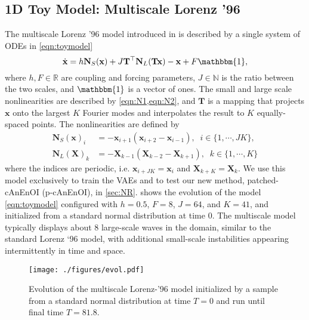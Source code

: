 \documentclass[final,3p]{elsarticle}
\theoremstyle{break}
\newcommand{\R}{\mathbb{R}}
\newcommand{\bb}[1]{\mathbf{#1}}
\begin{document}
\subsection{1D Toy Model: Multiscale Lorenz '96 }\label{methods:toymodel}
The multiscale Lorenz '96 model introduced in \cite{grooms2015framework} is described by a single system of ODEs in \cref{eqn:toymodel} 
\begin{equation}
    \dot{\bb{x}} =h\bb{N}_S(\bb{x})+J\bb{T}^{\top}\bb{N}_L(\bb{Tx})-\bb{x}+F\mathbbm{1},
    \label{eqn:toymodel}
\end{equation}
where $h,F\in\R$ are coupling and forcing parameters, $J\in\mathbb{N}$ is the ratio between the two scales, and $\mathbbm{1}$ is a vector of ones.
The small and large scale nonlinearities are described by \cref{eqn:N1,eqn:N2}, and $\bb{T}$ is a mapping that projects $\bb{x}$ onto the largest $K$ Fourier modes and interpolates the result to $K$ equally-spaced points.
The nonlinearities are defined by
\begin{align}
    \bb{N}_S(\bb{x})_i &= -\bb{x}_{i+1}(\bb{x}_{i+2}-\bb{x}_{i-1}),\;\;i\in\{1, \cdots, JK\},\label{eqn:N1}\\
    \bb{N}_L(\bb{X})_k &= -\bb{X}_{k-1}(\bb{X}_{k-2}-\bb{X}_{k+1}),\;\;k\in\{1, \cdots, K\}\label{eqn:N2}
\end{align}
where the indices are periodic, i.e. $\bb{x}_{i+JK}=\bb{x}_i$ and $\bb{X}_{k+K}=\bb{X}_k$.
We use this model exclusively to train the VAEs and to test our new method, patched-cAnEnOI (p-cAnEnOI), in \cref{sec:NR}.
 shows the evolution of the model \cref{eqn:toymodel} configured with $h=0.5$, $F=8$, $J=64$, and $K=41$, and initialized from a standard normal distribution at time 0.
The multiscale model typically displays about 8 large-scale waves in the domain, similar to the standard Lorenz `96 model, with additional small-scale instabilities appearing intermittently in time and space.
\begin{figure}[h]
 	\centering
 	\vspace{5pt}
 	\texttt{[image: ./figures/evol.pdf]}
 	\caption{\label{fig:evol} Evolution of the multiscale Lorenz-'96 model initialized by a sample from a standard normal distribution at time $T=0$ and run until final time $T=81.8$.}
\end{figure} 
\end{document}
